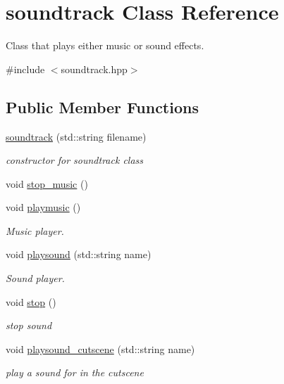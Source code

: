 \hypertarget{classsoundtrack}{}\section{soundtrack Class Reference}
\label{classsoundtrack}


Class that plays either music or sound effects.  




{\ttfamily \#include $<$soundtrack.\+hpp$>$}

\subsection*{Public Member Functions}
\begin{DoxyCompactItemize}
\item 
\hyperlink{classsoundtrack_add31bdeb1a693d541443f1d88586d3b6}{soundtrack} (std\+::string filename)
\begin{DoxyCompactList}\small\item\em constructor for soundtrack class \end{DoxyCompactList}\item 
void \hyperlink{classsoundtrack_a9f25fee4c6d5dbc820e2a18b13b43e68}{stop\+\_\+music} ()
\item 
void \hyperlink{classsoundtrack_a7569a4c0cde86548197756b8e05cf464}{playmusic} ()
\begin{DoxyCompactList}\small\item\em Music player. \end{DoxyCompactList}\item 
void \hyperlink{classsoundtrack_aa18de6469aca15922cfa8a8e8412f76d}{playsound} (std\+::string name)
\begin{DoxyCompactList}\small\item\em Sound player. \end{DoxyCompactList}\item 
void \hyperlink{classsoundtrack_a9047bea4f37493cbe81a990bc9d0c4e7}{stop} ()
\begin{DoxyCompactList}\small\item\em stop sound \end{DoxyCompactList}\item 
void \hyperlink{classsoundtrack_a83744518feb748a979a67a56fae997fe}{playsound\+\_\+cutscene} (std\+::string name)
\begin{DoxyCompactList}\small\item\em play a sound for in the cutscene \end{DoxyCompactList}\end{DoxyCompactItemize}
